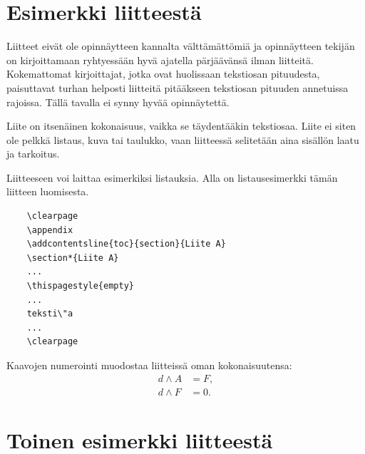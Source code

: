 \documentclass[english, 12pt, a4paper, elec, utf8, a-1b, online]{aaltothesis}
\begin{document}
\clearpage

\thesisappendix

\section{Esimerkki liitteest\"a\label{LiiteA}}

Liitteet eiv\"at ole opinn\"aytteen kannalta v\"altt\"am\"att\"omi\"a ja 
opinn\"aytteen tekij\"an on 
kirjoittamaan ryhtyess\"a\"an hyv\"a ajatella p\"arj\"a\"av\"ans\"a ilman liitteit\"a.
Kokemattomat kirjoittajat, jotka ovat huolissaan
tekstiosan pituudesta, paisuttavat turhan 
helposti liitteit\"a pit\"a\"akseen tekstiosan pituuden annetuissa rajoissa.
T\"all\"a tavalla ei synny hyv\"a\"a opinn\"aytett\"a.   

Liite on itsen\"ainen kokonaisuus, vaikka se t\"aydent\"a\"akin tekstiosaa.
Liite ei siten ole pelkk\"a listaus, kuva tai taulukko, vaan 
liitteess\"a selitet\"a\"an aina sis\"all\"on laatu ja tarkoitus. 

Liitteeseen voi laittaa esimerkiksi listauksia. Alla on 
listausesimerkki t\"am\"an liitteen luomisesta. 

\begin{verbatim}
	\clearpage
	\appendix
	\addcontentsline{toc}{section}{Liite A}
	\section*{Liite A}
	...
	\thispagestyle{empty}
	...
	teksti\"a
	...
	\clearpage
\end{verbatim}

Kaavojen numerointi muodostaa liitteiss\"a oman kokonaisuutensa:
\begin{align}
d \wedge A &= F, \label{liitekaava1}\\
d \wedge F &= 0. \label{liitekaava2}
\end{align}


\clearpage
\section{Toinen esimerkki liitteest\"a\label{LiiteB}}
\end{document}
